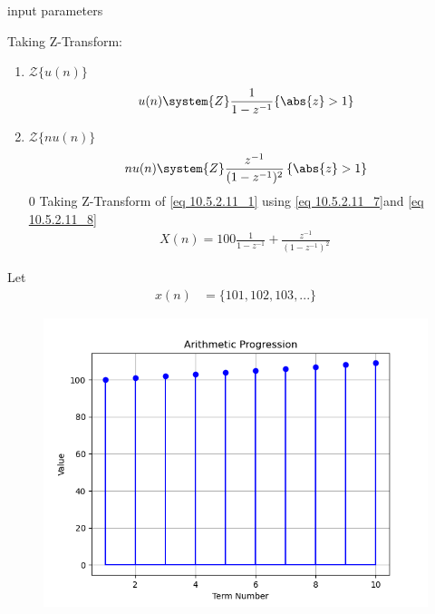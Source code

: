 \documentclass[journal,12pt,onecolumn]{IEEEtran}
\theoremstyle{remark}
\begin{document}
 
 \begin{table}[!ht]
    \centering
        
    \caption{input parameters}
    \label{tab:10_5_2_11}
\end{table}
Taking Z-Transform:
\begin{enumerate}
    \item $\mathcal{Z}\{u(n)\}$
\begin{align}
    u(n) \system{Z} \frac{1}{1-z^{-1}} \{\abs{z} > 1\} \label{eq 10.5.2.11_7}
\end{align}
    \item $\mathcal{Z}\{nu(n)\}$ 
\begin{align}
    nu(n) \system{Z} \frac{z^{-1}}{(1-z^{-1})^2}\, \{\abs{z} > 1\} \label{eq 10.5.2.11_8} 
\end{align}0
Taking Z-Transform of \eqref{eq 10.5.2.11_1} using \eqref{eq 10.5.2.11_7}and \eqref{eq 10.5.2.11_8}
\begin{align}
    X(n)=100\frac{1}{1-z^{-1}} +\frac{z^{-1}}{(1-z^{-1})^2}\
\end{align}
\end{enumerate}
Let \\
\begin{align}
x(n)&= \lbrace 101,102,103,...\rbrace 
\end{align}
\begin{figure}
    \centering
    \includegraphics{ncert-maths/10/5/2/11/figs/fig1.png}
    \caption{ }
    \label{fig:x(n) }
\end{figure}
 
\end{document}
